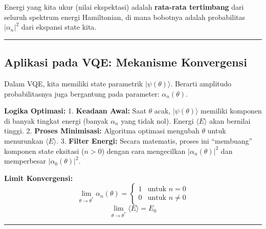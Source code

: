 Energi yang kita ukur (nilai ekspektasi) adalah \textbf{rata-rata tertimbang} dari seluruh spektrum energi Hamiltonian, di mana bobotnya adalah probabilitas \(|\alpha_n|^2\) dari ekspansi state kita.

\begin{center}\rule{0.5\linewidth}{0.5pt}\end{center}

\hypertarget{aplikasi-pada-vqe-mekanisme-konvergensi}{%
\subsection{Aplikasi pada VQE: Mekanisme Konvergensi}\label{aplikasi-pada-vqe-mekanisme-konvergensi}}

Dalam VQE, kita memiliki state parametrik \(|\psi(\theta)\rangle\). Berarti amplitudo probabilitasnya juga bergantung pada parameter: \(\alpha_n(\theta)\).

\textbf{Logika Optimasi:} 1. \textbf{Keadaan Awal:} Saat \(\theta\) acak, \(|\psi(\theta)\rangle\) memiliki komponen di banyak tingkat energi (banyak \(\alpha_n\) yang tidak nol). Energi \(\langle E \rangle\) akan bernilai tinggi. 2. \textbf{Proses Minimisasi:} Algoritma optimasi mengubah \(\theta\) untuk menurunkan \(\langle E \rangle\). 3. \textbf{Filter Energi:} Secara matematis, proses ini ``membuang'' komponen state eksitasi (\(n > 0\)) dengan cara mengecilkan \(|\alpha_n(\theta)|^2\) dan memperbesar \(|\alpha_0(\theta)|^2\).

\textbf{Limit Konvergensi:} \[ \lim_{\theta \to \theta^*} \alpha_n(\theta) = \begin{cases} 1 & \text{untuk } n=0 \\ 0 & \text{untuk } n \ne 0 \end{cases} \] \[ \lim_{\theta \to \theta^*} \langle E \rangle = E_0 \]

\begin{center}\rule{0.5\linewidth}{0.5pt}\end{center}